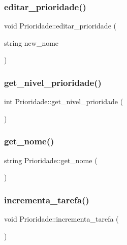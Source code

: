 \subsubsection{\texorpdfstring{editar\+\_\+prioridade()}{editar\_prioridade()}}
{\footnotesize\ttfamily void Prioridade\+::editar\+\_\+prioridade (\begin{DoxyParamCaption}\item[{string}]{new\+\_\+nome }\end{DoxyParamCaption})}

\mbox{\label{classPrioridade_a9660b4662782a91b1061217f9122034a}} 
\subsubsection{\texorpdfstring{get\+\_\+nivel\+\_\+prioridade()}{get\_nivel\_prioridade()}}
{\footnotesize\ttfamily int Prioridade\+::get\+\_\+nivel\+\_\+prioridade (\begin{DoxyParamCaption}{ }\end{DoxyParamCaption})}

\mbox{\label{classPrioridade_a01c961e447cff5a75d4400e6bcf59bb9}} 
\subsubsection{\texorpdfstring{get\+\_\+nome()}{get\_nome()}}
{\footnotesize\ttfamily string Prioridade\+::get\+\_\+nome (\begin{DoxyParamCaption}{ }\end{DoxyParamCaption})}

\mbox{\label{classPrioridade_a8895aedea7a5c69c073d69e3dec802f6}} 
\subsubsection{\texorpdfstring{incrementa\+\_\+tarefa()}{incrementa\_tarefa()}}
{\footnotesize\ttfamily void Prioridade\+::incrementa\+\_\+tarefa (\begin{DoxyParamCaption}{ }\end{DoxyParamCaption})}



